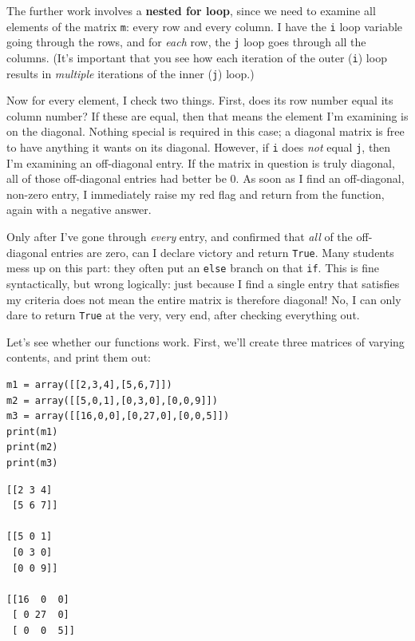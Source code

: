 
The further work involves a \textbf{nested for loop}, since we need to examine
all elements of the matrix \texttt{m}: every row and every column. I have the
\texttt{i} loop variable going through the rows, and for \textit{each} row, the
\texttt{j} loop goes through all the columns. (It's important that you see how
each iteration of the outer (\texttt{i}) loop results in \textit{multiple}
iterations of the inner (\texttt{j}) loop.)

Now for every element, I check two things. First, does its row number equal its
column number? If these are equal, then that means the element I'm examining is
on the diagonal. Nothing special is required in this case; a diagonal matrix is
free to have anything it wants on its diagonal. However, if \texttt{i} does
\textit{not} equal \texttt{j}, then I'm examining an off-diagonal entry. If the
matrix in question is truly diagonal, all of those off-diagonal entries had
better be 0. As soon as I find an off-diagonal, non-zero entry, I immediately
raise my red flag and return from the function, again with a negative answer.


Only after I've gone through \textit{every} entry, and confirmed that
\textit{all} of the off-diagonal entries are zero, can I declare victory and
return \texttt{True}. Many students mess up on this part: they often put an
\texttt{else} branch on that \texttt{if}. This is fine syntactically, but wrong
logically: just because I find a single entry that satisfies my criteria does
not mean the entire matrix is therefore diagonal! No, I can only dare to return
\texttt{True} at the very, very end, after checking everything out.

Let's see whether our functions work. First, we'll create three matrices of
varying contents, and print them out:

\begin{Verbatim}[fontsize=\small,samepage=true,frame=single,framesep=3mm]
m1 = array([[2,3,4],[5,6,7]])
m2 = array([[5,0,1],[0,3,0],[0,0,9]])
m3 = array([[16,0,0],[0,27,0],[0,0,5]])
print(m1)
print(m2)
print(m3)
\end{Verbatim}
\vspace{-.2in}

\begin{Verbatim}[fontsize=\small,samepage=true,frame=leftline,framesep=5mm,framerule=1mm]
[[2 3 4]
 [5 6 7]]

[[5 0 1]
 [0 3 0]
 [0 0 9]]

[[16  0  0]
 [ 0 27  0]
 [ 0  0  5]]
\end{Verbatim}

